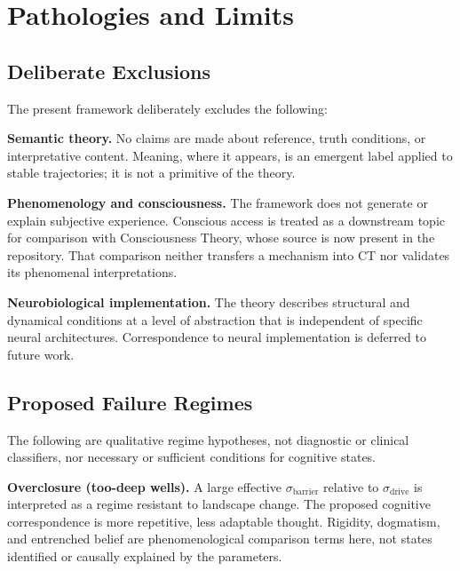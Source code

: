 
\section{Pathologies and Limits}
\label{sec:pathologies}

\subsection{Deliberate Exclusions}

The present framework deliberately excludes the following:

\textbf{Semantic theory.}
No claims are made about reference, truth conditions, or
interpretative content.
Meaning, where it appears, is an emergent label applied to stable
trajectories; it is not a primitive of the theory.

\textbf{Phenomenology and consciousness.}
The framework does not generate or explain subjective experience.
Conscious access is treated as a downstream topic for comparison with
Consciousness Theory, whose source is now present in the repository.
That comparison neither transfers a mechanism into CT nor validates its
phenomenal interpretations.

\textbf{Neurobiological implementation.}
The theory describes structural and dynamical conditions at a level
of abstraction that is independent of specific neural architectures.
Correspondence to neural implementation is deferred to future work.

\subsection{Proposed Failure Regimes}

The following are qualitative regime hypotheses, not diagnostic or clinical
classifiers, nor necessary or sufficient conditions for cognitive states.

\textbf{Overclosure (too-deep wells).}
A large effective $\sigma_{\mathrm{barrier}}$ relative to
$\sigma_{\mathrm{drive}}$ is interpreted as a regime resistant to
landscape change. The proposed cognitive correspondence is more
repetitive, less adaptable thought.
Rigidity, dogmatism, and entrenched belief are phenomenological comparison
terms here, not states identified or causally explained by the parameters.

